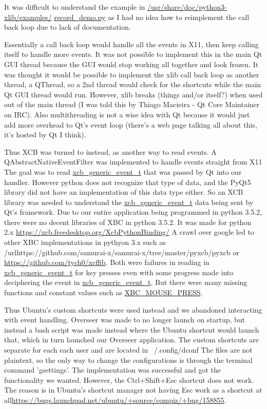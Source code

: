 \documentclass[12pt]{article}
\begin{document}
It was difficult to understand the example in \url{/usr/share/doc/python3-xlib/examples/}
\url{record_demo.py} as I had no idea how to reimplement the call back loop due to lack of documentation.

Essentially a call back loop would handle all the events in X11, then keep calling itself to handle more events.
It was not possible to implement this in the main Qt GUI thread because the GUI would stop working all together and look frozen.
It was thought it would be possible to implement the xlib call back loop as another thread, a QThread, so a 2nd thread would check for the shortcuts while the main Qt GUI thread would run.
However, xlib breaks (things and/or itself?) when used out of the main thread (I was told this by Thiago Macieira - Qt Core Maintainer on IRC).
Also multithreading is not a wise idea with Qt because it would just add more overhead to Qt's event loop (there's a web page talking all about this, it's hosted by Qt I think).

Thus XCB was turned to instead, as another way to read events.
A QAbstractNativeEventFilter was implemented to handle events straight from X11
The goal was to read \url{xcb_generic_event_t} that was passed by Qt into our handler.
However python does not recognize that type of data, and the PyQt5 library did not have an implementation of this data type either.
So an XCB library was needed to understand the \url{xcb_generic_event_t} data being sent by Qt's framework.
Due to our entire application being programmed in python 3.5.2, there were no decent libraries of XBC in python 3.5.2.
It was made for python 2.x
\url{https://xcb.freedesktop.org/XcbPythonBinding/}
A crawl over google led to other XBC implementations in pythyon 3.x such as /url{https://github.com/samurai-x/samurai-x/tree/master/pyxcb/pyxcb} or \url{https://github.com/tych0/xcffib}.
Both were failures in reading in \url{xcb_generic_event_t} for key presses even with some progress made into deciphering the event in \url{xcb_generic_event_t}.
But there were many missing functions and constant values such as \url{XBC_MOUSE_PRESS}.

Thus Ubuntu's custom shortcuts were used instead and we abandoned interacting with event handling. Overseer was made to no longer launch on startup, but instead a bash script was made instead where the Ubuntu shortcut would launch that, which in turn launched our Overseer application.
The custom shortcuts are separate for each each user and are located in ~/.config/dconf
The files are not plaintext, so the only way to change the configurations is through the terminal command 'gsettings'.
The implementation was successful and got the functionality we wanted.
However, the Ctrl+Shift+Esc shortcut does not work. The reason is in Ubuntu's shortcut manager not having Esc work as a shortcut at all\url{https://bugs.launchpad.net/ubuntu/+source/compiz/+bug/158855}.
\end{document}
